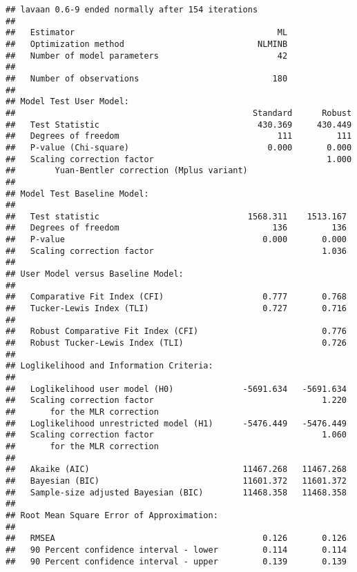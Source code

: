 \documentclass[
  english,
  man]{apa6}
\begin{document}
\begin{verbatim}
## lavaan 0.6-9 ended normally after 154 iterations
## 
##   Estimator                                         ML
##   Optimization method                           NLMINB
##   Number of model parameters                        42
##                                                       
##   Number of observations                           180
##                                                       
## Model Test User Model:
##                                                Standard      Robust
##   Test Statistic                                430.369     430.449
##   Degrees of freedom                                111         111
##   P-value (Chi-square)                            0.000       0.000
##   Scaling correction factor                                   1.000
##        Yuan-Bentler correction (Mplus variant)                     
## 
## Model Test Baseline Model:
## 
##   Test statistic                              1568.311    1513.167
##   Degrees of freedom                               136         136
##   P-value                                        0.000       0.000
##   Scaling correction factor                                  1.036
## 
## User Model versus Baseline Model:
## 
##   Comparative Fit Index (CFI)                    0.777       0.768
##   Tucker-Lewis Index (TLI)                       0.727       0.716
##                                                                   
##   Robust Comparative Fit Index (CFI)                         0.776
##   Robust Tucker-Lewis Index (TLI)                            0.726
## 
## Loglikelihood and Information Criteria:
## 
##   Loglikelihood user model (H0)              -5691.634   -5691.634
##   Scaling correction factor                                  1.220
##       for the MLR correction                                      
##   Loglikelihood unrestricted model (H1)      -5476.449   -5476.449
##   Scaling correction factor                                  1.060
##       for the MLR correction                                      
##                                                                   
##   Akaike (AIC)                               11467.268   11467.268
##   Bayesian (BIC)                             11601.372   11601.372
##   Sample-size adjusted Bayesian (BIC)        11468.358   11468.358
## 
## Root Mean Square Error of Approximation:
## 
##   RMSEA                                          0.126       0.126
##   90 Percent confidence interval - lower         0.114       0.114
##   90 Percent confidence interval - upper         0.139       0.139

\end{verbatim}
\end{document}
